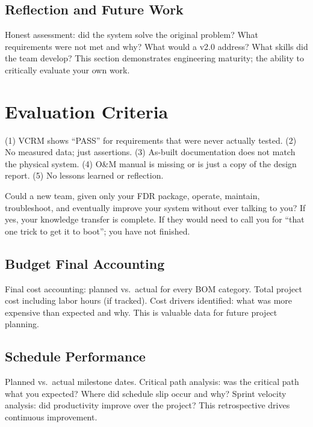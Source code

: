 \documentclass[11pt,letterpaper,twoside,openany]{book}
\begin{document}
\subsection{Reflection and Future Work}
Honest assessment: did the system solve the original problem? What requirements were not met and why? What would a v2.0 address? What skills did the team develop? This section demonstrates engineering maturity; the ability to critically evaluate your own work.

\section{Evaluation Criteria}

\begin{tipbox}
(1) VCRM shows ``PASS'' for requirements that were never actually tested. (2) No measured data; just assertions. (3) As-built documentation does not match the physical system. (4) O\&M manual is missing or is just a copy of the design report. (5) No lessons learned or reflection.
\end{tipbox}

\begin{tipbox}
Could a new team, given only your FDR package, operate, maintain, troubleshoot, and eventually improve your system without ever talking to you? If yes, your knowledge transfer is complete. If they would need to call you for ``that one trick to get it to boot''; you have not finished.
\end{tipbox}


\subsection{Budget Final Accounting}
Final cost accounting: planned vs.\ actual for every BOM category. Total project cost including labor hours (if tracked). Cost drivers identified: what was more expensive than expected and why. This is valuable data for future project planning.

\subsection{Schedule Performance}
Planned vs.\ actual milestone dates. Critical path analysis: was the critical path what you expected? Where did schedule slip occur and why? Sprint velocity analysis: did productivity improve over the project? This retrospective drives continuous improvement.
\end{document}
